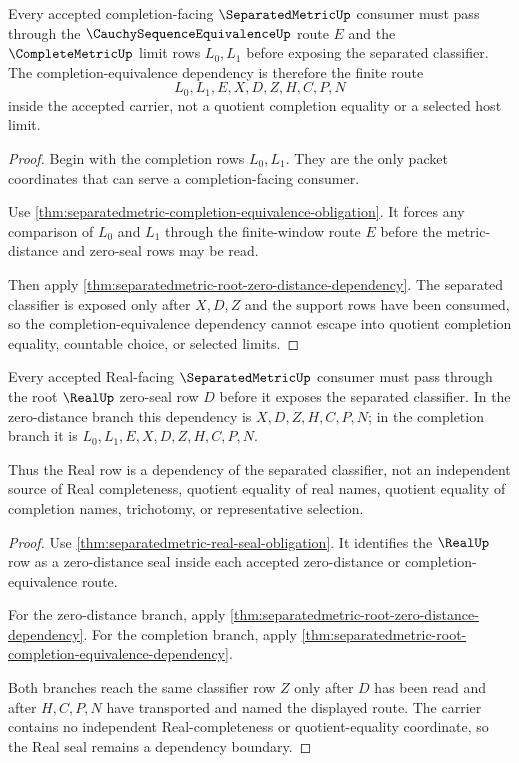 \begin{theorem}
\label{thm:separatedmetric-root-completion-equivalence-dependency}
Every accepted completion-facing $\SeparatedMetricUp$ consumer must pass through the $\CauchySequenceEquivalenceUp$ route $E$ and the $\CompleteMetricUp$ limit rows $L_0,L_1$ before exposing the separated classifier. The completion-equivalence dependency is therefore the finite route
$$
L_0,L_1,E,X,D,Z,H,C,P,N
$$
inside the accepted carrier, not a quotient completion equality or a selected host limit.
\end{theorem}
\begin{proof}
Begin with the completion rows $L_0,L_1$. They are the only packet coordinates that can serve a completion-facing consumer.

Use \autoref{thm:separatedmetric-completion-equivalence-obligation}. It forces any comparison of $L_0$ and $L_1$ through the finite-window route $E$ before the metric-distance and zero-seal rows may be read.

Then apply \autoref{thm:separatedmetric-root-zero-distance-dependency}. The separated classifier is exposed only after $X,D,Z$ and the support rows have been consumed, so the completion-equivalence dependency cannot escape into quotient completion equality, countable choice, or selected limits.
\end{proof}

\begin{theorem}
\label{thm:separatedmetric-root-real-seal-dependency}
Every accepted Real-facing $\SeparatedMetricUp$ consumer must pass through the root $\RealUp$ zero-seal row $D$ before it exposes the separated classifier. In the zero-distance branch this dependency is $X,D,Z,H,C,P,N$; in the completion branch it is $L_0,L_1,E,X,D,Z,H,C,P,N$.

Thus the Real row is a dependency of the separated classifier, not an independent source of Real completeness, quotient equality of real names, quotient equality of completion names, trichotomy, or representative selection.
\end{theorem}
\begin{proof}
Use \autoref{thm:separatedmetric-real-seal-obligation}. It identifies the $\RealUp$ row as a zero-distance seal inside each accepted zero-distance or completion-equivalence route.

For the zero-distance branch, apply \autoref{thm:separatedmetric-root-zero-distance-dependency}. For the completion branch, apply \autoref{thm:separatedmetric-root-completion-equivalence-dependency}.

Both branches reach the same classifier row $Z$ only after $D$ has been read and after $H,C,P,N$ have transported and named the displayed route. The carrier contains no independent Real-completeness or quotient-equality coordinate, so the Real seal remains a dependency boundary.
\end{proof}

